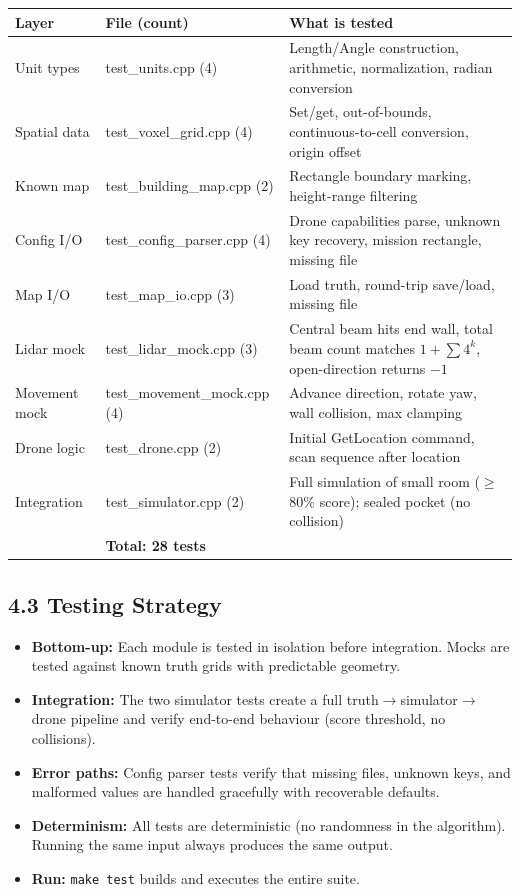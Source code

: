 \documentclass[12pt,a4paper]{article}
\begin{document}
\begin{center}
\small
\begin{tabular}{llp{7.5cm}}
\textbf{Layer} & \textbf{File (count)} & \textbf{What is tested} \\
\hline
Unit types & test\_units.cpp (4) & Length/Angle construction, arithmetic, normalization, radian conversion \\
Spatial data & test\_voxel\_grid.cpp (4) & Set/get, out-of-bounds, continuous-to-cell conversion, origin offset \\
Known map & test\_building\_map.cpp (2) & Rectangle boundary marking, height-range filtering \\
Config I/O & test\_config\_parser.cpp (4) & Drone capabilities parse, unknown key recovery, mission rectangle, missing file \\
Map I/O & test\_map\_io.cpp (3) & Load truth, round-trip save/load, missing file \\
Lidar mock & test\_lidar\_mock.cpp (3) & Central beam hits end wall, total beam count matches $1+\sum 4^k$, open-direction returns $-1$ \\
Movement mock & test\_movement\_mock.cpp (4) & Advance direction, rotate yaw, wall collision, max clamping \\
Drone logic & test\_drone.cpp (2) & Initial GetLocation command, scan sequence after location \\
Integration & test\_simulator.cpp (2) & Full simulation of small room ($\ge$80\% score); sealed pocket (no collision) \\
\hline
& \textbf{Total: 28 tests} &
\end{tabular}
\end{center}

\subsection{4.3 Testing Strategy}

\begin{itemize}[nosep]
\item \textbf{Bottom-up:} Each module is tested in isolation before integration.
      Mocks are tested against known truth grids with predictable geometry.
\item \textbf{Integration:} The two simulator tests create a full
      truth$\to$simulator$\to$drone pipeline and verify end-to-end behaviour
      (score threshold, no collisions).
\item \textbf{Error paths:} Config parser tests verify that missing files,
      unknown keys, and malformed values are handled gracefully with recoverable
      defaults.
\item \textbf{Determinism:} All tests are deterministic (no randomness in the
      algorithm). Running the same input always produces the same output.
\item \textbf{Run:} \texttt{make test} builds and executes the entire suite.
\end{itemize}
\end{document}
